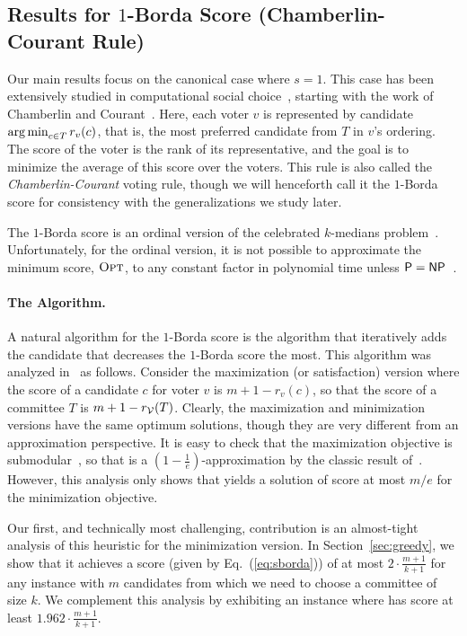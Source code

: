\subsection{Results for $1$-Borda Score (Chamberlin-Courant Rule)}
Our main results focus on the canonical case where $s = 1$. This case has been extensively studied in computational social choice~\cite{LuB,SkworonFL,SkworonFS15,Heuristics,Elkind17,BrillFST19}, starting with the work of Chamberlin and Courant~\cite{CC}.  Here, each voter $v$ is represented by candidate $\operatorname{arg\,min}_{c \in T} r_v(c)$, that is, the most preferred candidate from $T$ in $v$'s ordering. The score of the voter is the rank of its representative, and the goal is to minimize the average of this score over the voters. This rule is also called the {\em Chamberlin-Courant} voting rule, though we will henceforth call it the $1$-Borda score for consistency with the generalizations we study later.

The $1$-Borda score is an ordinal version of the celebrated $k$-medians problem~\cite{AryaGKMMP04}. Unfortunately, for the ordinal version, it is not possible to approximate the minimum  score, ${\normalfont\textsc{Opt}}$, to any constant factor in polynomial time unless $\mathsf{P} = \mathsf{NP}$~\cite{SkworonFS15}.

\paragraph{The \g{} Algorithm.} A natural algorithm for the $1$-Borda score is the \g{} algorithm that iteratively adds the candidate that decreases the $1$-Borda score the most. This algorithm was analyzed in~\cite{LuB} as follows. Consider the maximization (or satisfaction) version where the score of a candidate $c$ for voter $v$ is $m + 1 - r_v(c)$, so that the score of a committee $T$ is $m + 1 - r_{\mathcal{V}}(T)$. Clearly, the maximization and minimization versions have the same optimum solutions, though they are very different from an approximation perspective. It is easy to check that the maximization objective is submodular~\cite{LuB}, so that \g{} is a $\left(1 - \frac{1}{e}\right)$-approximation by the classic result of~\cite{NWF}. However, this analysis only shows that \g{} yields a solution of score at most $m/e$ for the minimization objective.

Our first, and technically most challenging, contribution is an almost-tight analysis of this \g{} heuristic for the minimization version. In Section~\ref{sec:greedy}, we show that it achieves a score (given by Eq.~(\ref{eq:sborda})) of at most $2 \cdot\frac{m+1}{k+1}$ for any instance with $m$ candidates from which we need to choose a committee of size $k$. We complement this analysis by exhibiting an instance where \g{} has score at least $1.962 \cdot\frac{m+1}{k+1}$. 

